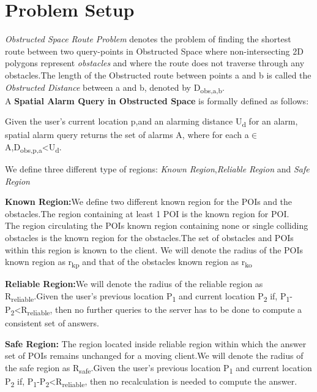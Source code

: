 \section{Problem Setup}
\textit{Obstructed Space Route Problem} denotes the problem of finding the shortest route between two query-points  in Obstructed Space where non-intersecting 2D polygons represent \textit{obstacles} and where the route does not traverse through any obstacles.The length of the Obstructed route between points a and b is called the \textit{Obstructed Distance} between a and b, denoted by D\textsubscript{obs,a,b}.\\
A \textbf{Spatial Alarm Query in Obstructed Space} is formally defined as follows:
\begin{defn}
Given the user's current location p,and an alarming distance U\textsubscript{d} for an alarm, spatial alarm query returns the set of alarms A, where for each a$\in$ A,D\textsubscript{obs,p,a}<U\textsubscript{d}. 
\end{defn}
We define three different type of regions: \textit{Known Region},\textit{Reliable Region} and \textit{Safe Region}

\begin{defn} \textbf{Known Region:}We define two different known region for the POIs and the obstacles.The region containing at least 1 POI is the known region for POI.\\
The region circulating the POIs known region containing none or single colliding obstacles is the known region for the obstacles.The set of obstacles and POIs within this region is known to the client. 
We will denote the radius of the POIs known region as r\textsubscript{kp} and that of the obstacles known region as r\textsubscript{ko}
\end{defn}

\begin{defn}
\textbf{Reliable Region:}We will denote the radius of the reliable region as R\textsubscript{reliable}.Given the user's previous location P\textsubscript{1} and current location P\textsubscript{2} if, P\textsubscript{1}-P\textsubscript{2}<R\textsubscript{reliable}, then no further queries to the server has to be done to compute a consistent set of answers.
\end{defn}

\begin{defn}\textbf{Safe Region:} 
The region located inside reliable region within which the answer set of POIs remains unchanged for a moving client.We will denote the radius of the safe region as R\textsubscript{safe}.Given the user's previous location P\textsubscript{1} and current location P\textsubscript{2} if, P\textsubscript{1}-P\textsubscript{2}<R\textsubscript{reliable}, then no recalculation is needed to compute the answer.
\end{defn}


